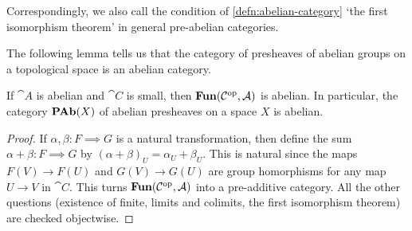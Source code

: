 \documentclass[../main.tex]{subfiles}
\begin{document}
Correspondingly, we also call the condition of \cref{defn:abelian-category} `the first isomorphism theorem' in general pre-abelian categories.

The following lemma tells us that the category of presheaves of abelian groups on a topological space is an abelian category. 
\begin{lem}
If $\cat A$ is abelian and $\cat C$ is small, then $\operatorname{\mathbf{Fun}}(\mathcal{C}^{\mathrm{op}}, \mathcal{A})$ is abelian.
In particular, the category \(\operatorname{\mathbf{PAb}}(X)\) of abelian presheaves on a space \(X\) is abelian.
\end{lem}
\begin{proof}
  If $\alpha, \beta\colon F \implies G$ is a natural transformation, then define the sum $\alpha + \beta\colon F \implies G$ by $(\alpha + \beta)_U = \alpha_U + \beta_U$. This is natural since the maps $F(V) \to F(U)$ and $G(V) \to G(U)$ are group homorphisms for any map $U \to V$ in $\cat C$. This turns $\operatorname{\mathbf{Fun}}(\mathcal{C}^{\mathrm{op}}, \mathcal{A})$ into a pre-additive category. All the other questions (existence of finite, limits and colimits, the first isomorphism theorem) are checked objectwise.
\end{proof}
\end{document}
